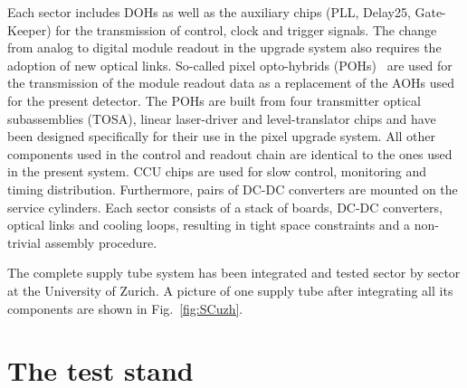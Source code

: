 \noindent Each sector includes DOHs as well as the auxiliary chips (PLL, Delay25, Gate-Keeper) for the transmission of control, clock and trigger signals.
The change from analog to digital module readout in the upgrade system also requires the adoption of new optical links.
So-called pixel opto-hybrids (POHs)~\cite{1748-0221-7-01-C01113} are used for the transmission of the module readout data as a replacement of the AOHs used for the present detector.
The POHs are built from four transmitter optical subassemblies (TOSA), linear laser-driver and level-translator chips and have been designed specifically for their use in the pixel upgrade system.
All other components used in the control and readout chain are identical to the ones used in the present system. CCU chips are used for slow control, monitoring and timing distribution.
Furthermore, pairs of DC-DC converters are mounted on the service cylinders.
Each sector consists of a stack of boards, DC-DC converters, optical links and cooling loops, resulting in tight space constraints and a non-trivial assembly procedure.

The complete supply tube system has been integrated and tested sector by sector at the University of Zurich. A picture of one supply tube after integrating all its components are shown in Fig.~\ref{fig:SCuzh}.

\section{The test stand}

